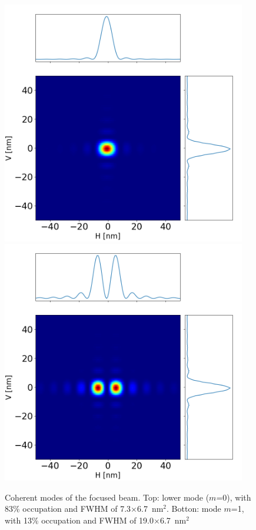 \documentclass{iucr}              %
\begin{document}
\begin{figure}\label{fig:final modes}
    \centering
        \includegraphics[width=0.95\textwidth]{GRAPHICS/final_mode0.png}
        \includegraphics[width=0.95\textwidth]{GRAPHICS/final_mode1.png}
    \caption{Coherent modes of the focused beam. Top: lower mode ($m$=0), with 83\% occupation and FWHM of 7.3$\times$6.7~nm$^2$. Botton: mode $m$=1, with 13\% occupation and FWHM of 19.0$\times$6.7~nm$^2$}
\end{figure}
 
\end{document}
